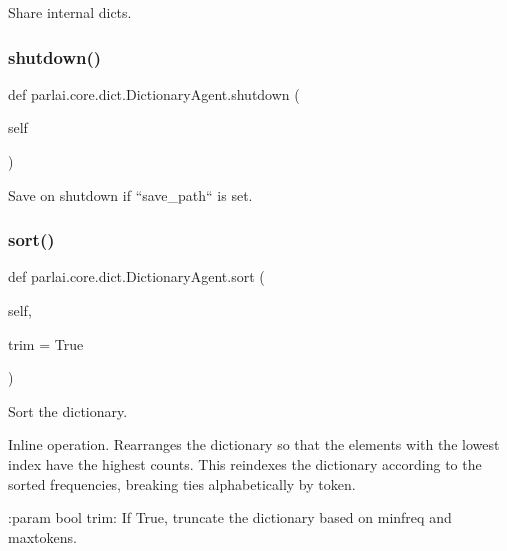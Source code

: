 \begin{DoxyVerb}Share internal dicts.
\end{DoxyVerb}
 \mbox{\label{classparlai_1_1core_1_1dict_1_1DictionaryAgent_aea9aca40dd1bb1976f4042565b172d88}} 
\subsubsection{\texorpdfstring{shutdown()}{shutdown()}}
{\footnotesize\ttfamily def parlai.\+core.\+dict.\+Dictionary\+Agent.\+shutdown (\begin{DoxyParamCaption}\item[{}]{self }\end{DoxyParamCaption})}

\begin{DoxyVerb}Save on shutdown if ``save_path`` is set.
\end{DoxyVerb}
 \mbox{\label{classparlai_1_1core_1_1dict_1_1DictionaryAgent_a84cb4fabf5d0e92e3f80ac16bdfd0ccc}} 
\subsubsection{\texorpdfstring{sort()}{sort()}}
{\footnotesize\ttfamily def parlai.\+core.\+dict.\+Dictionary\+Agent.\+sort (\begin{DoxyParamCaption}\item[{}]{self,  }\item[{}]{trim = {\ttfamily True} }\end{DoxyParamCaption})}

\begin{DoxyVerb}Sort the dictionary.

Inline operation. Rearranges the dictionary so that the elements with
the lowest index have the highest counts. This reindexes the dictionary
according to the sorted frequencies, breaking ties alphabetically by
token.

:param bool trim:
    If True, truncate the dictionary based on minfreq and maxtokens.
\end{DoxyVerb}
 \mbox{\label{classparlai_1_1core_1_1dict_1_1DictionaryAgent_a437d3aacc7b55dac587643b271ba5f38}} 
